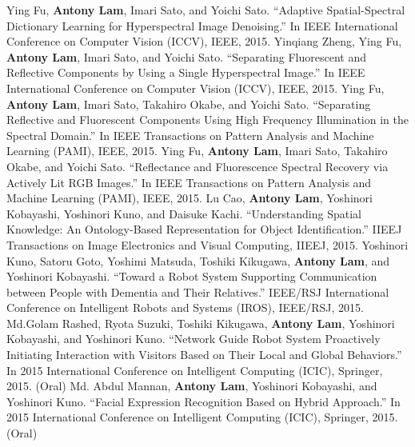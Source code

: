 \documentclass[letterpaper,10pt]{article}
\begin{document}
Ying Fu, \textbf{Antony Lam}, Imari Sato, and Yoichi Sato. ``Adaptive Spatial-Spectral Dictionary Learning for Hyperspectral Image Denoising.'' In IEEE International Conference on Computer Vision (ICCV), IEEE, 2015.\vspace{0.05in}\newline
Yinqiang Zheng, Ying Fu, \textbf{Antony Lam}, Imari Sato, and Yoichi Sato. ``Separating Fluorescent and Reflective Components by Using a Single Hyperspectral Image.'' In IEEE International Conference on Computer Vision (ICCV), IEEE, 2015.\vspace{0.05in}\newline
Ying Fu, \textbf{Antony Lam}, Imari Sato, Takahiro Okabe, and Yoichi Sato. ``Separating Reflective and Fluorescent Components Using High Frequency Illumination in the Spectral Domain.'' In IEEE Transactions on Pattern Analysis and Machine Learning (PAMI), IEEE, 2015.\vspace{0.05in}\newline
Ying Fu, \textbf{Antony Lam}, Imari Sato, Takahiro Okabe, and Yoichi Sato. ``Reflectance and Fluorescence Spectral Recovery via Actively Lit RGB Images.'' In IEEE Transactions on Pattern Analysis and Machine Learning (PAMI), IEEE, 2015.\vspace{0.05in}\newline
Lu Cao, \textbf{Antony Lam}, Yoshinori Kobayashi, Yoshinori Kuno, and Daisuke Kachi. ``Understanding Spatial Knowledge: An Ontology-Based Representation for Object Identification.'' IIEEJ Transactions on Image Electronics and Visual Computing, IIEEJ, 2015.\vspace{0.05in}\newline
Yoshinori Kuno, Satoru Goto, Yoshimi Matsuda, Toshiki Kikugawa, \textbf{Antony Lam}, and Yoshinori Kobayashi. ``Toward a Robot System Supporting Communication between People with Dementia and Their Relatives.'' IEEE/RSJ International Conference on Intelligent Robots and Systems (IROS), IEEE/RSJ, 2015.\vspace{0.05in}\newline
Md.Golam Rashed, Ryota Suzuki, Toshiki Kikugawa, \textbf{Antony Lam}, Yoshinori Kobayashi, and Yoshinori Kuno. ``Network Guide Robot System Proactively Initiating Interaction with Visitors Based on Their Local and Global Behaviors.'' In 2015 International Conference on Intelligent Computing (ICIC), Springer, 2015. (Oral)\vspace{0.05in}\newline
Md. Abdul Mannan, \textbf{Antony Lam}, Yoshinori Kobayashi, and Yoshinori Kuno. ``Facial Expression Recognition Based on Hybrid Approach.'' In 2015 International Conference on Intelligent Computing (ICIC), Springer, 2015. (Oral)\vspace{0.05in}\newline
\end{document}
